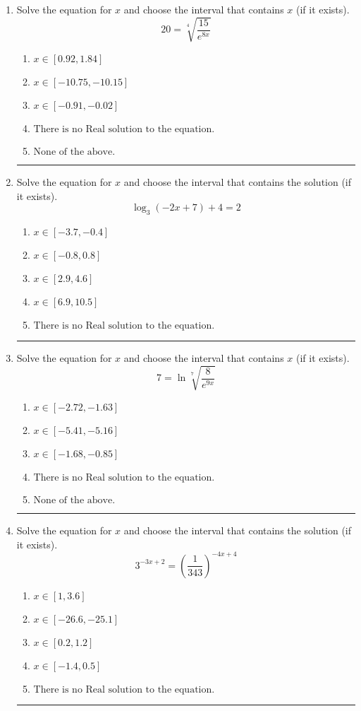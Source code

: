 \documentclass[14pt]{extbook}
\newcommand{\litem}[1]{\item#1\hspace*{-1cm}\rule{\textwidth}{0.4pt}}
\begin{document}
\begin{enumerate}
{\begin{enumerate}[label=\Alph*.]
\end{enumerate} }
\litem{
 Solve the equation for $x$ and choose the interval that contains $x$ (if it exists).\[  20 = \sqrt[4]{\frac{15}{e^{8x}}} \]\begin{enumerate}[label=\Alph*.]
\item \( x \in [0.92, 1.84] \)
\item \( x \in [-10.75, -10.15] \)
\item \( x \in [-0.91, -0.02] \)
\item \( \text{There is no Real solution to the equation.} \)
\item \( \text{None of the above.} \)

\end{enumerate} }
\litem{
Solve the equation for $x$ and choose the interval that contains the solution (if it exists).\[ \log_{3}{(-2x+7)}+4 = 2 \]\begin{enumerate}[label=\Alph*.]
\item \( x \in [-3.7, -0.4] \)
\item \( x \in [-0.8, 0.8] \)
\item \( x \in [2.9, 4.6] \)
\item \( x \in [6.9, 10.5] \)
\item \( \text{There is no Real solution to the equation.} \)

\end{enumerate} }
\litem{
 Solve the equation for $x$ and choose the interval that contains $x$ (if it exists).\[  7 = \ln{\sqrt[7]{\frac{8}{e^{9x}}}} \]\begin{enumerate}[label=\Alph*.]
\item \( x \in [-2.72, -1.63] \)
\item \( x \in [-5.41, -5.16] \)
\item \( x \in [-1.68, -0.85] \)
\item \( \text{There is no Real solution to the equation.} \)
\item \( \text{None of the above.} \)

\end{enumerate} }
\litem{
Solve the equation for $x$ and choose the interval that contains the solution (if it exists).\[ 3^{-3x+2} = \left(\frac{1}{343}\right)^{-4x+4} \]\begin{enumerate}[label=\Alph*.]
\item \( x \in [1, 3.6] \)
\item \( x \in [-26.6, -25.1] \)
\item \( x \in [0.2, 1.2] \)
\item \( x \in [-1.4, 0.5] \)
\item \( \text{There is no Real solution to the equation.} \)


\end{enumerate}}
\end{enumerate}
\end{document}
